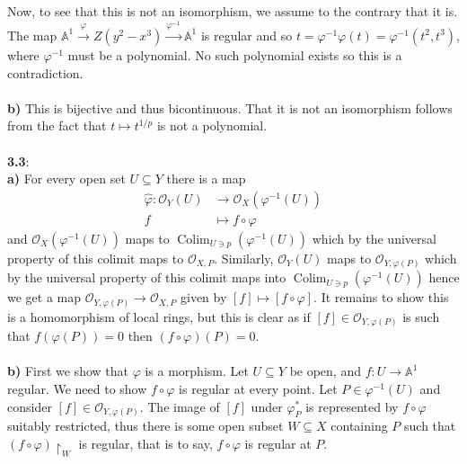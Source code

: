 \documentclass[12pt]{article}
\numberwithin{thm}{subsection}
\numberwithin{defn}{subsection}
\numberwithin{lemma}{subsection}
\numberwithin{example}{subsection}
\numberwithin{notation}{subsection}
\numberwithin{cor}{subsection}
\numberwithin{remark}{subsection}
\numberwithin{condition}{subsection}
\numberwithin{question}{subsection}
\numberwithin{construction}{subsection}
\numberwithin{construction}{subsection}
\numberwithin{construction}{subsection}
\newcommand{\bb}[1]{\mathbb{#1}}
\newcommand{\call}[1]{\mathcal{#1}}
\newcommand{\lto}{\longrightarrow}
\begin{document}
Now, to see that this is not an isomorphism, we assume to the contrary that it is. The map $\bb{A}^1 \stackrel{\varphi}{\lto} Z(y^2 - x^3) \stackrel{\varphi^{-1}}{\lto} \bb{A}^1$ is regular and so $t = \varphi^{-1}\varphi(t) = \varphi^{-1}(t^2,t^3)$, where $\varphi^{-1}$ must be a polynomial. No such polynomial exists so this is a contradiction.\\\\
%
\textbf{b)} This is bijective and thus bicontinuous. That it is not an isomorphism follows from the fact that $t \mapsto t^{1/p}$ is not a polynomial.\\\\
%
\textbf{3.3}:\\
\textbf{a)} For every open set $U \subseteq Y$ there is a map
\begin{align*}
    \hat{\varphi}: \call{O}_Y(U) &\lto \call{O}_X(\varphi^{-1}(U))\\
    f & \mapsto f \circ \varphi
\end{align*}
and $\call{O}_X(\varphi^{-1}(U))$ maps to $\operatorname{Colim}_{U \ni p}(\varphi^{-1}(U))$ which by the universal property of this colimit maps to $\call{O}_{X,P}$. Similarly, $\call{O}_Y(U)$ maps to $\call{O}_{Y,\varphi(P)}$ which by the universal property of this colimit maps into $\operatorname{Colim}_{U \ni p}(\varphi^{-1}(U))$ hence we get a map $\call{O}_{Y,\varphi(P)} \lto \call{O}_{X,P}$ given by $[f] \mapsto [f \circ \varphi]$. It remains to show this is a homomorphism of local rings, but this is clear as if $[f] \in \call{O}_{Y,\varphi(P)}$ is such that $f(\varphi(P)) = 0$ then $(f \circ\varphi)(P) = 0$.\\\\
\textbf{b)} First we show that $\varphi$ is a morphism. Let $U \subseteq Y$ be open, and $f: U \lto \bb{A}^1$ regular. We need to show $f \circ \varphi$ is regular at every point. Let $P \in \varphi^{-1}(U)$ and consider $[f] \in \call{O}_{Y,\varphi(P)}$. The image of $[f]$ under $\varphi_P^\ast$ is represented by $f \circ \varphi$ suitably restricted, thus there is some open subset $W \subseteq X$ containing $P$ such that $(f \circ \varphi)\restriction_W$ is regular, that is to say, $f \circ \varphi$ is regular at $P$.
\end{document}
